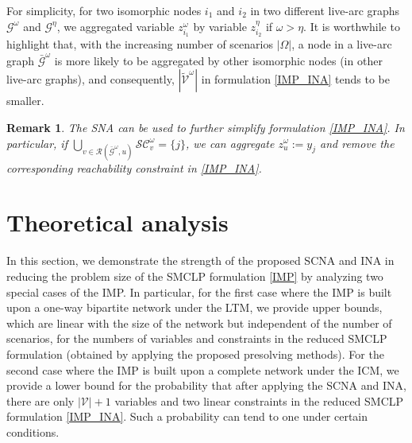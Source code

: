 \documentclass[a4paper,10pt]{article}
\theoremstyle{plain}
\newtheorem{remark}[theorem]{Remark}
\newcommand{\rev}[1]{{\color{black}#1}}
\newcommand{\revv}[1]{{#1}}
\begin{document}
	For simplicity, for two isomorphic nodes $i_1$ and $i_2$ in two different live-arc graphs $\mathcal{G}^\omega$ and $\mathcal{G}^\eta$, we aggregated variable $z_{i_1}^\omega$ by  variable $z_{i_2}^\eta$ if $\omega > \eta$.
	It is worthwhile to highlight that, with the increasing number of scenarios $|\Omega|$, a node in a live-arc graph $\bar{\mathcal{G}}^\omega$ is more likely to be aggregated by other isomorphic nodes (in other live-arc graphs), and 
	consequently,  $|\tilde{\mathcal{V}}^\omega|$ in formulation \eqref{IMP_INA} tends to be smaller.  
	
	\begin{remark}
		The SNA can be used to further simplify formulation \eqref{IMP_INA}. In particular, if $\bigcup_{v\in\mathcal{R}(\bar{\mathcal{G}}^{\omega},u)}\mathcal{SC}^{\omega}_v=\{j\}$,  we can aggregate $z_u^\omega:=y_j$ and remove the corresponding reachability constraint in \eqref{IMP_INA}.
	\end{remark}
	
	\section{Theoretical analysis}\label{sect:analysis}
	
	
	In this section, we demonstrate the strength of the proposed SCNA and INA in reducing the problem size of the SMCLP formulation \eqref{IMP} by analyzing two special cases of the IMP.
	In particular, for the first case where the IMP is built upon a one-way bipartite \revv{network} under the LTM, 
	we \revv{provide} upper bounds, 
	which are linear with the size of the \revv{network} but independent of the number of scenarios,
	for the numbers of variables and constraints in the reduced SMCLP formulation (obtained by applying the proposed presolving methods).
	\rev{For the second case where the IMP is built upon a complete  \revv{network} under the ICM, we provide a lower bound for the probability that after applying the SCNA and INA, there are only $|\mathcal{V}|+1$ variables and two linear constraints in the reduced SMCLP formulation \eqref{IMP_INA}. Such a probability can tend to one under certain conditions.}
	
\end{document}
